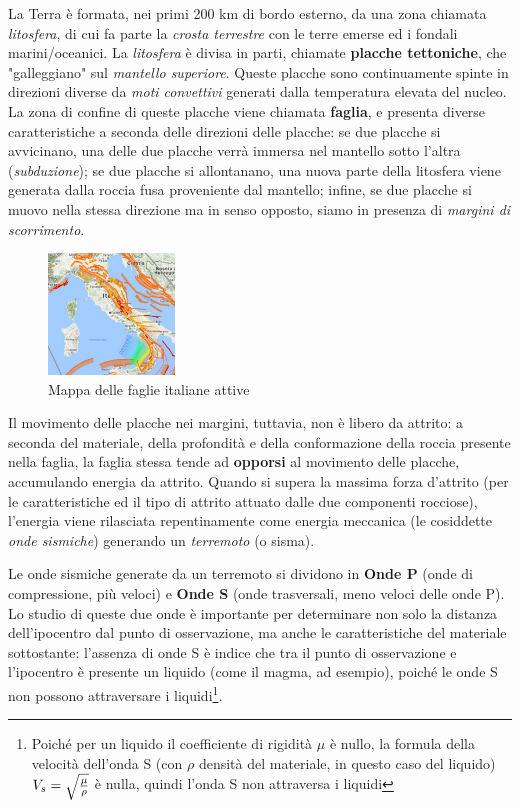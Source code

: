 \documentclass[a4paper,10pt]{memoir}
\begin{document}
La Terra è formata, nei primi 200 km di bordo esterno, da una zona chiamata \textit{litosfera}, di cui fa parte la \textit{crosta terrestre} con le terre emerse ed i fondali marini/oceanici. La \textit{litosfera} è divisa in parti, chiamate \textbf{placche tettoniche}, che "galleggiano" sul \textit{mantello superiore}. Queste placche sono continuamente spinte in direzioni diverse da \textit{moti convettivi} generati dalla temperatura elevata del nucleo. La zona di confine di queste placche viene chiamata \textbf{faglia}, e presenta diverse caratteristiche a seconda delle direzioni delle placche: se due placche si avvicinano, una delle due placche verrà immersa nel mantello sotto l'altra (\textit{subduzione}); se due placche si allontanano, una nuova parte della litosfera viene generata dalla roccia fusa proveniente dal mantello; infine, se due placche si muovo nella stessa direzione ma in senso opposto, siamo in presenza di \textit{margini di scorrimento}.

\begin{figure}
\caption{Mappa delle faglie italiane attive}
\label{fig:mappafaglie}
\includegraphics[width=0.30\textwidth]{introduzione/mappa_faglie_italiane2}
\end{figure}

Il movimento delle placche nei margini, tuttavia, non è libero da attrito: a seconda del materiale, della profondità e della conformazione della roccia presente nella faglia, la faglia stessa tende ad \textbf{opporsi} al movimento delle placche, accumulando energia da attrito. Quando si supera la massima forza d'attrito (per le caratteristiche ed il tipo di attrito attuato dalle due componenti rocciose), l'energia viene rilasciata repentinamente come energia meccanica (le cosiddette \textit{onde sismiche}) generando un \textit{terremoto} (o sisma).

Le onde sismiche generate da un terremoto si dividono in \textbf{Onde P} (onde di compressione, più veloci) e \textbf{Onde S} (onde trasversali, meno veloci delle onde P). Lo studio di queste due onde è importante per determinare non solo la distanza dell'ipocentro dal punto di osservazione, ma anche le caratteristiche del materiale sottostante: l'assenza di onde S è indice che tra il punto di osservazione e l'ipocentro è presente un liquido (come il magma, ad esempio), poiché le onde S non possono attraversare i liquidi\footnote{Poiché per un liquido il coefficiente di rigidità $\mu$ è nullo, la formula della velocità dell'onda S (con $\rho$ densità del materiale, in questo caso del liquido) $V_s = \sqrt{\mu \over \rho}$ è nulla, quindi l'onda S non attraversa i liquidi}.
\end{document}
